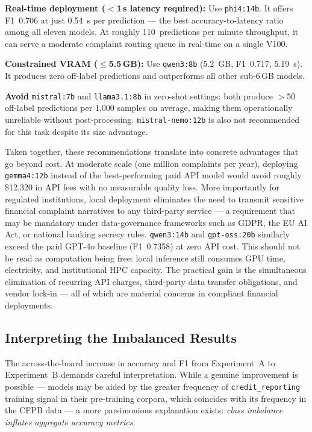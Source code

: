 \documentclass[a4paper,fleqn]{cas-dc}
\begin{document}
\textbf{Real-time deployment ($<$1\,s latency required):}
Use \texttt{phi4:14b}. It offers F1~0.706 at just 0.54~s per
prediction --- the best accuracy-to-latency ratio among all eleven models.
At roughly 110~predictions per minute throughput, it can serve a
moderate complaint routing queue in real-time on a single V100.

\textbf{Constrained VRAM ($\leq$5.5\,GB):}
Use \texttt{qwen3:8b} (5.2~GB, F1~0.717, 5.19~s). It produces zero
off-label predictions and outperforms all other sub-6\,GB models.

\textbf{Avoid} \texttt{mistral:7b} and \texttt{llama3.1:8b} in
zero-shot settings: both produce $>$50 off-label predictions per
1,000 samples on average, making them operationally unreliable
without post-processing.
\texttt{mistral-nemo:12b} is also not recommended for this task
despite its size advantage.

Taken together, these recommendations translate into concrete
advantages that go beyond cost. At moderate scale (one million
complaints per year), deploying \texttt{gemma4:12b} instead of the
best-performing paid API model would avoid roughly \$12,320 in API
fees with no measurable quality loss. More importantly for regulated
institutions, local deployment eliminates the need to transmit
sensitive financial complaint narratives to any third-party service
--- a requirement that may be mandatory under data-governance
frameworks such as GDPR, the EU AI Act, or national banking secrecy
rules. \texttt{qwen3:14b} and \texttt{gpt-oss:20b} similarly exceed
the paid GPT-4o baseline (F1~0.7358) at zero API cost. This should
not be read as computation being free: local inference still consumes
GPU time, electricity, and institutional HPC capacity. The practical
gain is the simultaneous elimination of recurring API charges,
third-party data transfer obligations, and vendor lock-in --- all
of which are material concerns in compliant financial deployments.

\subsection{Interpreting the Imbalanced Results}

The across-the-board increase in accuracy and F1 from Experiment~A
to Experiment~B demands careful interpretation. While a genuine
improvement is possible --- models may be aided by the greater
frequency of \texttt{credit\_reporting} training signal in
their pre-training corpora, which coincides with its frequency in
the CFPB data --- a more parsimonious explanation exists:
\emph{class imbalance inflates aggregate accuracy metrics}.
\end{document}
